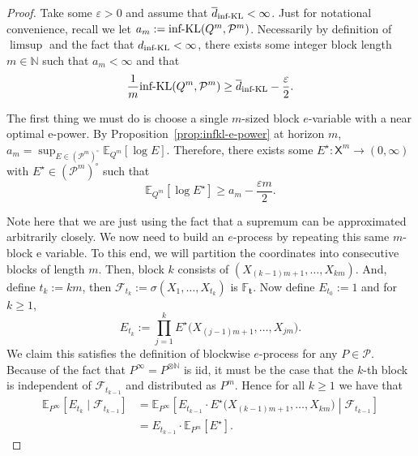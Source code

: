 \documentclass[11pt]{article}
\newcommand{\infKL}{\textnormal{inf-KL}}
\newcommand{\E}{\mathbb{E}}
\newcommand{\Pcal}{\mathcal{P}}
\newcommand{\X}{\mathsf{X}}
\newcommand{\bbF}{\mathbb F}
\newcommand{\bt}{\mathbf t}
\theoremstyle{definition}
\theoremstyle{definition}
\begin{document}
\begin{proof}
Take some $\varepsilon>0$ and assume that $\overline d_{\infKL}<\infty$. Just for notational convenience, recall we let $a_m:=\infKL(Q^m, \Pcal^m)$. Necessarily by definition of $\limsup$ and the fact that $d_{\infKL}<\infty$, there exists some integer block length $m\in\mathbb N$ such that $a_m<\infty$ and that
\begin{equation}\label{eq:choose-m-close}
\frac{1}{m}\infKL(Q^m, \Pcal^m)\ge \overline d_{\infKL}-\frac{\varepsilon}{2}.
\end{equation}

The first thing we must do is choose a single $m$-sized block $e$-variable with a near optimal e-power. By Proposition~\ref{prop:infkl-e-power} at horizon $m$, $a_m=\sup_{E\in(\Pcal^m)^\circ}\E_{Q^m}[\log E]$. Therefore, there exists some $E^{\star}:\X^m\to(0,\infty)$ with $E^{\star}\in(\Pcal^m)^\circ$ such that
\begin{equation}\label{eq:E-star-near-opt}
\E_{Q^m}[\log E^\star]\ge a_m-\frac{\varepsilon m}{2}.    
\end{equation}

Note here that we are just using the fact that a supremum can be approximated arbitrarily closely. We now need to build an $e$-process by repeating this same $m$-block e variable. To this end, we will partition the coordinates into consecutive blocks of length $m$. Then, block $k$ consists of $(X_{(k-1)m+1},\dots,X_{km})$. And, define $t_k:=km$, then $\mathcal F_{t_k}:=\sigma(X_1,\dots,X_{t_k})$ is $\bbF_{\bt}$. Now define $E_{t_0}:=1$ and for $k\ge 1$,
\[
E_{t_k}:=\prod_{j=1}^k E^\star\bigl(X_{(j-1)m+1},\dots,X_{jm}\bigr).
\]
We claim this satisfies the definition of blockwise $e$-process for any $P\in\Pcal$. Because of the fact that $P^\infty=P^{\otimes\mathbb N}$ is iid, it must be the case that the $k$-th block is independent of $\mathcal F_{t_{k-1}}$ and distributed as $P^m$. Hence for all $k\ge 1$ we have that
\begin{align*}
\E_{P^\infty}[E_{t_k}\mid\mathcal F_{t_{k-1}}]&=\E_{P^\infty}\left[ E_{t_{k-1}}\cdot E^\star\bigl(X_{(k-1)m+1},\dots,X_{km}\bigr)\middle|\mathcal F_{t_{k-1}}\right]\\
&=E_{t_{k-1}}\cdot \E_{P^m}[E^\star].
\end{align*}


\end{proof}
\end{document}
